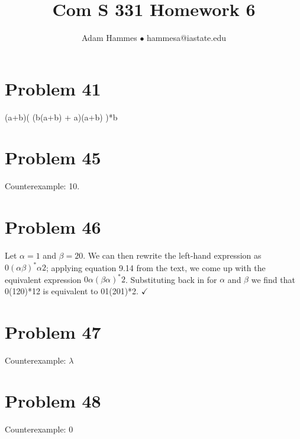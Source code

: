 \documentclass[11pt]{article}
\begin{document}
\title{Com S 331 Homework 6}
\author{Adam Hammes $\bullet$ hammesa@iastate.edu}
\maketitle

\section*{Problem 41}

(a+b)( (b(a+b) + a)(a+b) )*b

\section*{Problem 45}

Counterexample: 10.

\section*{Problem 46}

Let $\alpha = 1$ and $\beta = 20$. We can then rewrite the left-hand expression as $0(\alpha \beta)^*\alpha2$; applying equation 9.14 from the text, we come up with the equivalent expression 
$0\alpha(\beta \alpha)^*2$. Substituting back in for $\alpha$ and $\beta$ we find that 0(120)*12 is equivalent to 01(201)*2. $ \checkmark $


\section*{Problem 47}

Counterexample: $\lambda$

\section*{Problem 48}

Counterexample: 0
\end{document}
